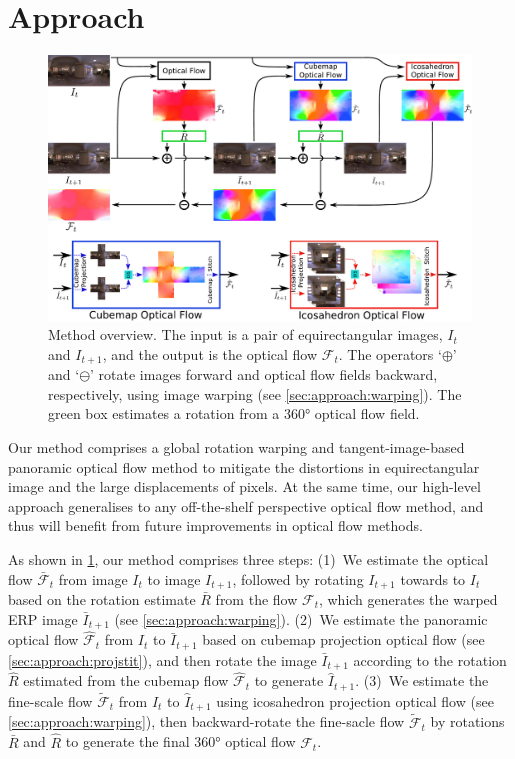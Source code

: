 \section{Approach}
\label{sec:approach}

\begin{figure}%
	\centering
	\includegraphics[width=0.95\linewidth]{images/method_pipeline_1.pdf}
	\caption{Method overview.
		The input is a pair of equirectangular images, $I_t$ and $I_{t+1}$, and the output is the optical flow $\mathcal{F}_t$.
		The operators `$\oplus$' and `$\ominus$' rotate images forward and optical flow fields backward, respectively, using image warping (see \cref{sec:approach:warping}).
		The green box estimates a rotation from a 360° optical flow field.
	}
	\label{fig:approach:pipeline}
\end{figure}

Our method comprises a global rotation warping and tangent-image-based panoramic optical flow method to mitigate the distortions in equirectangular image and the large displacements of pixels.
At the same time, our high-level approach generalises to any off-the-shelf perspective optical flow method, and thus will benefit from future improvements in optical flow methods.


As shown in \cref{fig:approach:pipeline}, our method comprises three steps:
%
(1)~We estimate the optical flow $\bar{\mathcal{F}}_t$ from image $I_{t}$ to image ${I_{t+1}}$, followed by rotating $I_{t+1}$ towards to $I_{t}$ based on the rotation estimate $\bar{R}$ from the flow $\mathcal{F}_t$, which generates the warped ERP image ${\bar{I}}_{t+1}$ (see \cref{sec:approach:warping}).
%
(2)~We estimate the panoramic optical flow ${\hat{\mathcal{F}}}_t$ from $I_{t}$ to ${\bar{I}}_{t+1}$ based on cubemap projection optical flow (see \cref{sec:approach:projstit}), and then rotate the image ${\bar{I}}_{t+1}$ according to the rotation $\hat{R}$ estimated from the cubemap flow ${\hat{\mathcal{F}}}_t$ to generate ${\hat{I}}_{t+1}$.
%
(3)~We estimate the fine-scale flow $\tilde{\mathcal{F}}_t$ from $I_{t}$ to ${\hat{I}}_{t+1}$ using icosahedron projection optical flow (see \cref{sec:approach:warping}), then backward-rotate the fine-sacle flow $\tilde{\mathcal{F}}_t$ by rotations $\bar{R}$ and $\hat{R}$ to generate the final 360° optical flow $\mathcal{F}_t$.


